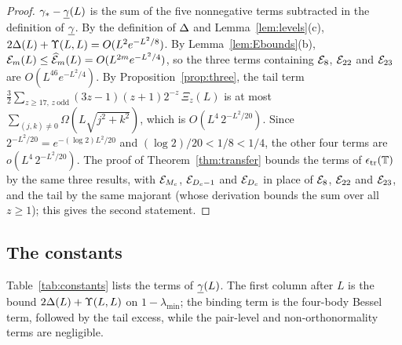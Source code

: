 \begin{proof}
$\gamma_{*}-\underline{\gamma}(L)$ is the sum of the five nonnegative terms subtracted in the definition of $\underline{\gamma}$. By the definition of $\Delta$ and
Lemma~\ref{lem:levels}(c), $2\Delta(L)+\Upsilon(L,L)=O(L^2e^{-L^2/8})$. By Lemma~\ref{lem:Ebounds}(b),
$\mathcal{E}_m(L)\le\widehat{\mathcal{E}}_m(L)=O(L^{2m}e^{-L^2/4})$, so the three terms containing $\mathcal{E}_8$, $\mathcal{E}_{22}$ and $\mathcal{E}_{23}$ are
$O(L^{46}e^{-L^2/4})$. By Proposition~\ref{prop:three}, the tail term
$\frac32\sum_{z\ge17,\,z\ \mathrm{odd}}(3z-1)(z+1)2^{-z}\,\Xi_z(L)$ is at most $\sum_{(j,k)\neq0}\Omega(L\sqrt{j^2+k^2})$, which is
$O(L^4\,2^{-L^2/20})$. Since $2^{-L^2/20}=e^{-(\log2)L^2/20}$ and $(\log2)/20<1/8<1/4$, the other four terms are
$o(L^4\,2^{-L^2/20})$. The proof of Theorem~\ref{thm:transfer} bounds the terms of $\epsilon_{\mathrm{tr}}(\mathbb{T})$ by the same three results, with
$\mathcal{E}_{M_c}$, $\mathcal{E}_{D_c-1}$ and $\mathcal{E}_{D_c}$ in place of $\mathcal{E}_8$, $\mathcal{E}_{22}$ and $\mathcal{E}_{23}$, and the tail by the same majorant (whose
derivation bounds the sum over all $z\ge1$); this gives the second statement.
\end{proof}

\subsection{The constants}\label{ssec:constants}

Table~\ref{tab:constants} lists the terms of $\underline{\gamma}(L)$. The first column after $L$ is the bound $2\Delta(L)+\Upsilon(L,L)$ on
$1-\lambda_{\min}$; the binding term is the four-body Bessel term, followed by the tail excess, while the pair-level and
non-orthonormality terms are negligible.

